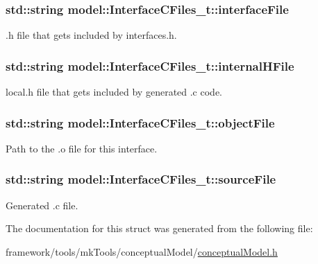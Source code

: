 \subsubsection[{\texorpdfstring{interface\+File}{interfaceFile}}]{\setlength{\rightskip}{0pt plus 5cm}std\+::string model\+::\+Interface\+C\+Files\+\_\+t\+::interface\+File}\hypertarget{structmodel_1_1_interface_c_files__t_af2cb2ed30a32cfa8465455ca41b1f33c}{}\label{structmodel_1_1_interface_c_files__t_af2cb2ed30a32cfa8465455ca41b1f33c}


.h file that gets included by interfaces.\+h. 

\subsubsection[{\texorpdfstring{internal\+H\+File}{internalHFile}}]{\setlength{\rightskip}{0pt plus 5cm}std\+::string model\+::\+Interface\+C\+Files\+\_\+t\+::internal\+H\+File}\hypertarget{structmodel_1_1_interface_c_files__t_a744e7b0e5c916fa842fb405289008cea}{}\label{structmodel_1_1_interface_c_files__t_a744e7b0e5c916fa842fb405289008cea}


local.\+h file that gets included by generated .c code. 

\subsubsection[{\texorpdfstring{object\+File}{objectFile}}]{\setlength{\rightskip}{0pt plus 5cm}std\+::string model\+::\+Interface\+C\+Files\+\_\+t\+::object\+File}\hypertarget{structmodel_1_1_interface_c_files__t_ac0a73d1804bbb3fdba88eac037f48538}{}\label{structmodel_1_1_interface_c_files__t_ac0a73d1804bbb3fdba88eac037f48538}


Path to the .o file for this interface. 

\subsubsection[{\texorpdfstring{source\+File}{sourceFile}}]{\setlength{\rightskip}{0pt plus 5cm}std\+::string model\+::\+Interface\+C\+Files\+\_\+t\+::source\+File}\hypertarget{structmodel_1_1_interface_c_files__t_a1fa26aa1b6063489544054469bda9fe5}{}\label{structmodel_1_1_interface_c_files__t_a1fa26aa1b6063489544054469bda9fe5}


Generated .c file. 



The documentation for this struct was generated from the following file\+:\begin{DoxyCompactItemize}
\item 
framework/tools/mk\+Tools/conceptual\+Model/\hyperlink{conceptual_model_8h}{conceptual\+Model.\+h}\end{DoxyCompactItemize}
